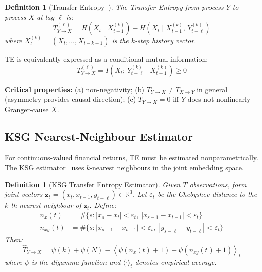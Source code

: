 \documentclass[12pt,a4paper]{article}
\newtheorem{definition}[theorem]{Definition}
\newcommand{\R}{\mathbb{R}}
\newcommand{\bm}[1]{\boldsymbol{#1}}
\begin{document}
\begin{definition}[Transfer Entropy~\citep{schreiber2000}]
The Transfer Entropy from process $Y$ to process $X$ at lag $\ell$ is:
\begin{equation}
    T_{Y \to X}^{(\ell)} = H\!\left(X_t \mid X_{t-1}^{(k)}\right)
    - H\!\left(X_t \mid X_{t-1}^{(k)},\, Y_{t-\ell}^{(k)}\right)
\end{equation}
where $X_t^{(k)} = (X_t, \ldots, X_{t-k+1})$ is the $k$-step history vector.
\end{definition}

TE is equivalently expressed as a conditional mutual information:
\begin{equation}
    T_{Y \to X}^{(\ell)} = I\!\left(X_t;\, Y_{t-\ell}^{(k)} \mid X_{t-1}^{(k)}\right) \geq 0
\end{equation}

\textbf{Critical properties:} (a) non-negativity; (b) $T_{Y \to X} \neq T_{X \to Y}$
in general (asymmetry provides causal direction); (c) $T_{Y \to X} = 0$ iff $Y$
does not nonlinearly Granger-cause $X$.

\subsection{KSG Nearest-Neighbour Estimator}

For continuous-valued financial returns, TE must be estimated nonparametrically.
The KSG estimator~\citep{kraskov2004} uses $k$-nearest neighbours in the joint
embedding space.

\begin{definition}[KSG Transfer Entropy Estimator]
Given $T$ observations, form joint vectors $\bm{z}_t = (x_t, x_{t-1}, y_{t-\ell}) \in \R^3$.
Let $\varepsilon_t$ be the Chebyshev distance to the $k$-th nearest neighbour of $\bm{z}_t$.
Define:
\begin{align}
    n_x(t) &= \#\{s : |x_s - x_t| < \varepsilon_t,\; |x_{s-1} - x_{t-1}| < \varepsilon_t\} \\
    n_{xy}(t) &= \#\{s : |x_{s-1}-x_{t-1}| < \varepsilon_t,\; |y_{s-\ell}-y_{t-\ell}| < \varepsilon_t\}
\end{align}
Then:
\begin{equation}
    \hat{T}_{Y \to X} = \psi(k) + \psi(N) - \left\langle \psi(n_x(t)+1) + \psi(n_{xy}(t)+1) \right\rangle_t
\end{equation}
where $\psi$ is the digamma function and $\langle\cdot\rangle_t$ denotes empirical average.
\end{definition}
\end{document}
